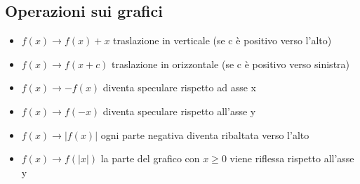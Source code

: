 \subsection{Operazioni sui grafici}
\begin{itemize}
	\item $ f\left( x \right) \to f\left( x \right) +x$ \quad traslazione in verticale (se c è positivo verso l'alto)
	\item $ f\left( x \right) \rightarrow f\left( x+c \right) $ \quad traslazione in orizzontale (se c è positivo verso sinistra)
	\item $f\left( x \right)  \rightarrow -f\left( x \right) $ \quad diventa speculare rispetto ad asse x
	\item $f\left( x \right) \rightarrow f\left( -x \right) $ diventa speculare rispetto all'asse y
	\item $f\left( x \right) \rightarrow \left|f\left( x \right) \right|$ \quad ogni parte negativa diventa ribaltata verso l'alto
	\item $f\left( x \right) \rightarrow f\left( \left|x\right| \right) $ \quad la parte del grafico con $x\ge 0 $ viene riflessa rispetto all'asse y
\end{itemize}
\begin{minipage}[t]{0.48\textwidth}
\end{minipage}
%
\begin{minipage}[t]{0.48\textwidth}

\end{minipage}

